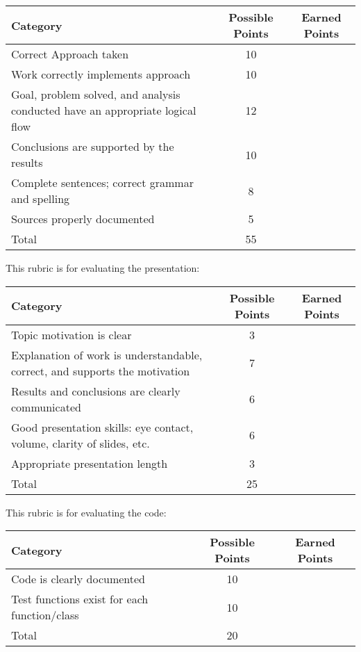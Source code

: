 \documentclass[a4paper, 12 pt]{curve}
\begin{document}
\vspace*{1 em}
\begin{center}
\begin{tabu}{| X | c | c |}\hline
\textbf{Category} & \textbf{Possible Points} & \textbf{Earned Points} \\ \hline \hline
Correct Approach taken & 10 & \\ \hline
Work correctly implements approach & 10 & \\ \hline
Goal, problem solved, and analysis conducted have an appropriate logical flow & 12 & \\ \hline
Conclusions are supported by the results & 10 & \\ \hline
Complete sentences; correct grammar and spelling & 8 & \\ \hline
Sources properly documented & 5 & \\ \hline
Total & 55 & \\\hline
\end{tabu} 
\end{center}

This rubric is for evaluating the presentation:

\vspace*{1 em}
\begin{center}
\begin{tabu}{| X | c | c |}\hline
\textbf{Category} & \textbf{Possible Points} & \textbf{Earned Points} \\ \hline \hline
Topic motivation is clear & 3 & \\ \hline
Explanation of work is understandable, correct, and supports the motivation & 7 & \\ \hline
Results and conclusions are clearly communicated & 6 & \\ \hline
Good presentation skills: eye contact, volume, clarity of slides, etc. & 6 & \\ \hline
Appropriate presentation length & 3 & \\ \hline
Total & 25 & \\\hline
\end{tabu} 
\end{center}

This rubric is for evaluating the code:

\vspace*{1 em}
\begin{center}
\begin{tabu}{| X | c | c |}\hline
\textbf{Category} & \textbf{Possible Points} & \textbf{Earned Points} \\ \hline \hline
Code is clearly documented & 10 & \\ \hline
Test functions exist for each function/class & 10 & \\ \hline
Total & 20 & \\\hline
\end{tabu} 
\end{center}
\end{document}
